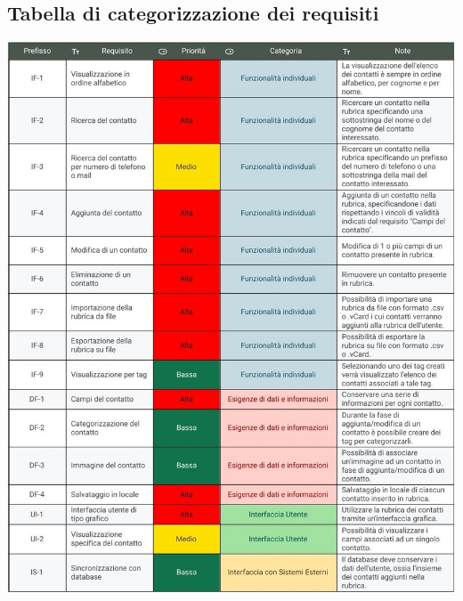 \subsection{Tabella di categorizzazione dei requisiti}
\begin{adjustbox}{width=.8\paperwidth, height=.8\paperheight, center}
	\includegraphics{images/Categorizzazione requisiti.jpg}
\end{adjustbox}
\label{categorizzazione_dei_requisiti}

\newpage
